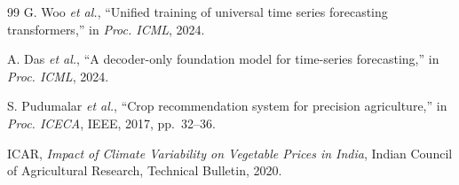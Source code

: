 \documentclass[conference]{IEEEtran}
\begin{document}
\begin{thebibliography}{99}
G. Woo \emph{et al.}, ``Unified training of universal time series forecasting transformers,'' in \emph{Proc. ICML}, 2024.

A. Das \emph{et al.}, ``A decoder-only foundation model for time-series forecasting,'' in \emph{Proc. ICML}, 2024.

S. Pudumalar \emph{et al.}, ``Crop recommendation system for precision agriculture,'' in \emph{Proc. ICECA}, IEEE, 2017, pp.~32--36.

ICAR, \emph{Impact of Climate Variability on Vegetable Prices in India}, Indian Council of Agricultural Research, Technical Bulletin, 2020.

\end{thebibliography}
\end{document}
